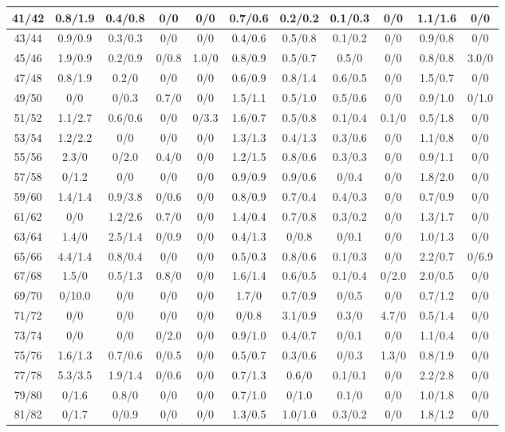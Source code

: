 \begin{table*}[htb]
\begin{tabular}{|c| c c c c c c c c c c |}
41/42&0.8/1.9& 0.4/0.8& 0/0& 0/0& 0.7/0.6& 0.2/0.2& 0.1/0.3& 0/0& 1.1/1.6& 0/0\\\hline
43/44&0.9/0.9& 0.3/0.3& 0/0& 0/0& 0.4/0.6& 0.5/0.8& 0.1/0.2& 0/0& 0.9/0.8& 0/0\\\hline
45/46&1.9/0.9& 0.2/0.9& 0/0.8& 1.0/0& 0.8/0.9& 0.5/0.7& 0.5/0& 0/0& 0.8/0.8& 3.0/0\\\hline
47/48&0.8/1.9& 0.2/0& 0/0& 0/0& 0.6/0.9& 0.8/1.4& 0.6/0.5& 0/0& 1.5/0.7& 0/0\\\hline
49/50&0/0& 0/0.3& 0.7/0& 0/0& 1.5/1.1& 0.5/1.0& 0.5/0.6& 0/0& 0.9/1.0& 0/1.0\\\hline
51/52&1.1/2.7& 0.6/0.6& 0/0& 0/3.3& 1.6/0.7& 0.5/0.8& 0.1/0.4& 0.1/0& 0.5/1.8& 0/0\\\hline
53/54&1.2/2.2& 0/0& 0/0& 0/0& 1.3/1.3& 0.4/1.3& 0.3/0.6& 0/0& 1.1/0.8& 0/0\\\hline
55/56&2.3/0& 0/2.0& 0.4/0& 0/0& 1.2/1.5& 0.8/0.6& 0.3/0.3& 0/0& 0.9/1.1& 0/0\\\hline
57/58&0/1.2& 0/0& 0/0& 0/0& 0.9/0.9& 0.9/0.6& 0/0.4& 0/0& 1.8/2.0& 0/0\\\hline
59/60&1.4/1.4& 0.9/3.8& 0/0.6& 0/0& 0.8/0.9& 0.7/0.4& 0.4/0.3& 0/0& 0.7/0.9& 0/0\\\hline
61/62&0/0& 1.2/2.6& 0.7/0& 0/0& 1.4/0.4& 0.7/0.8& 0.3/0.2& 0/0& 1.3/1.7& 0/0\\\hline
63/64&1.4/0& 2.5/1.4& 0/0.9& 0/0& 0.4/1.3& 0/0.8& 0/0.1& 0/0& 1.0/1.3& 0/0\\\hline
65/66&4.4/1.4& 0.8/0.4& 0/0& 0/0& 0.5/0.3& 0.8/0.6& 0.1/0.3& 0/0& 2.2/0.7& 0/6.9\\\hline
67/68&1.5/0& 0.5/1.3& 0.8/0& 0/0& 1.6/1.4& 0.6/0.5& 0.1/0.4& 0/2.0& 2.0/0.5& 0/0\\\hline
69/70&0/10.0& 0/0& 0/0& 0/0& 1.7/0& 0.7/0.9& 0/0.5& 0/0& 0.7/1.2& 0/0\\\hline
71/72&0/0& 0/0& 0/0& 0/0& 0/0.8& 3.1/0.9& 0.3/0& 4.7/0& 0.5/1.4& 0/0\\\hline
73/74&0/0& 0/0& 0/2.0& 0/0& 0.9/1.0& 0.4/0.7& 0/0.1& 0/0& 1.1/0.4& 0/0\\\hline
75/76&1.6/1.3& 0.7/0.6& 0/0.5& 0/0& 0.5/0.7& 0.3/0.6& 0/0.3& 1.3/0& 0.8/1.9& 0/0\\\hline
77/78&5.3/3.5& 1.9/1.4& 0/0.6& 0/0& 0.7/1.3& 0.6/0& 0.1/0.1& 0/0& 2.2/2.8& 0/0\\\hline
79/80&0/1.6& 0.8/0& 0/0& 0/0& 0.7/1.0& 0/1.0& 0.1/0& 0/0& 1.0/1.8& 0/0\\\hline
81/82&0/1.7& 0/0.9& 0/0& 0/0& 1.3/0.5& 1.0/1.0& 0.3/0.2& 0/0& 1.8/1.2& 0/0\\\hline

\end{tabular}
\end{table*}
